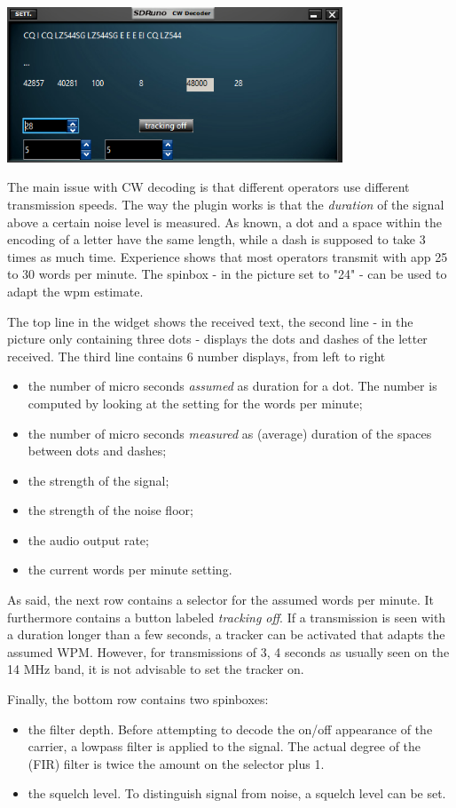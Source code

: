 \documentclass[11pt]{article}
\begin{document}
\includegraphics[width=100mm]{cw-plugin-widget.png}

The main issue with CW decoding is that different operators use different
transmission speeds.
The way the plugin works is that the {\em duration} of the signal above
a certain noise level is measured. As known, a dot and a space within the
encoding of a letter have the same length, while a dash is supposed to take 3 times as much time.
Experience shows that most operators transmit with app 25 to 30 words per
minute. The spinbox - in the picture set to "24" - can be used to adapt 
the wpm estimate.

The top line in the widget shows the received text,
the second line - in the picture only containing three dots -
displays the dots and dashes of the letter received.
The third line contains 6 number displays, from left to right
\begin{itemize}
\item the number of micro seconds {\em assumed} as duration for a dot. The 
number is computed by looking at the setting for the words per minute;
\item the number of micro seconds {\em measured} as (average) duration of
the spaces between dots and dashes;
\item the strength of the signal;
\item the strength of the noise floor;
\item the audio output rate; 
\item the current words per minute setting.
\end{itemize}

As said, the next row contains a selector for the assumed words per minute.
It furthermore contains a button labeled {\em tracking off}. If a transmission
is seen with a duration longer than a few seconds, a tracker can be activated
that adapts the assumed WPM. However, for transmissions of 3, 4 seconds
as usually seen on the 14 MHz band, it is not advisable to set the tracker on.

Finally, the bottom row contains two spinboxes:
\begin{itemize}
\item the filter depth. Before attempting to decode the on/off appearance
of the carrier, a lowpass filter is applied to the signal. The actual
degree of the (FIR) filter is twice the amount on the selector plus 1.
\item the squelch level. To distinguish signal from noise, a squelch level
can be set.
\end{itemize}
\end{document}
